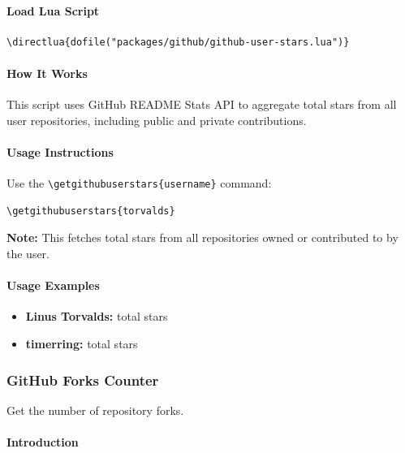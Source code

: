 \documentclass{article}
\begin{document}
\paragraph{Load Lua Script}

\begin{verbatim}
\directlua{dofile("packages/github/github-user-stars.lua")}
\end{verbatim}

\paragraph{How It Works}

This script uses GitHub README Stats API to aggregate total stars from all user repositories, including public and private contributions.

\paragraph{Usage Instructions}

Use the \verb|\getgithubuserstars{username}| command:

\begin{verbatim}
\getgithubuserstars{torvalds}
\end{verbatim}

\textbf{Note:} This fetches total stars from all repositories owned or contributed to by the user.

\paragraph{Usage Examples}

\begin{itemize}
    \item \textbf{Linus Torvalds:}  total stars
    \item \textbf{timerring:}  total stars
\end{itemize}

\subsubsection{GitHub Forks Counter}

Get the number of repository forks.

\paragraph{Introduction}
\end{document}
